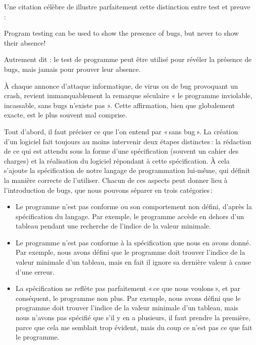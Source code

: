 Une citation célèbre de 
 illustre parfaitement cette distinction entre test et preuve :


\begin{Quotation}[Dijkstra]
Program testing can be used to show the presence of bugs, but never to show
their absence!
\end{Quotation}



Autrement dit : le test de programme peut être utilisé pour révéler la présence
de bugs, mais jamais pour prouver leur absence.





À chaque annonce d’attaque informatique, de virus ou de bug provoquant un crash,
revient immanquablement la remarque séculaire « le programme inviolable,
incassable, sans bugs n'existe pas ». Cette affirmation, bien que globalement
exacte, est le plus souvent mal comprise.



Tout d’abord, il faut préciser ce que l’on entend par « sans bug ».
La création d’un logiciel fait toujours au moins intervenir deux étapes
distinctes : la rédaction de ce qui est attendu sous la forme d’une spécification
(souvent un cahier des charges) et la réalisation du logiciel répondant à cette
spécification. À cela s’ajoute la spécification de notre langage de
programmation lui-même, qui définit la manière correcte de l’utiliser. Chacun de
ces aspects peut donner lieu à l’introduction de bugs, que nous pouvons
séparer en trois catégories :
\begin{itemize}
\item Le programme n’est pas conforme ou son comportement non défini,
      d’après la spécification du langage. Par exemple, le programme accède
      en dehors d’un tableau pendant une recherche de l'indice de la valeur
      minimale.
\item Le programme n’est pas conforme à la spécification que nous en avons
      donné. Par exemple, nous avons défini que le programme doit trouver
      l'indice de la valeur minimale d’un tableau, mais en fait il ignore sa
      dernière valeur à cause d’une erreur.
\item La spécification ne reflète pas parfaitement « ce que nous voulons »,
      et par conséquent, le programme non plus. Par exemple, nous avons
      défini que le programme doit trouver l'indice de la valeur minimale
      d’un tableau, mais nous n’avons pas spécifié que s’il y en a plusieurs,
      il faut prendre la première, parce que cela me semblait trop évident,
      mais du coup ce n’est pas ce que fait le programme.
\end{itemize}


